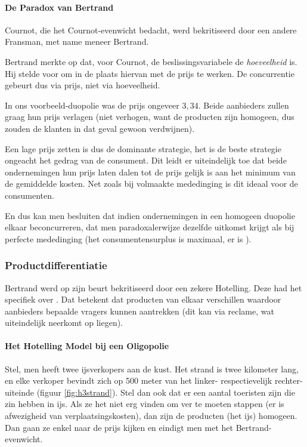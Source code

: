 \paragraph{De Paradox van Bertrand}

Cournot, die het Cournot-evenwicht bedacht, werd bekritiseerd door een andere Fransman, met name meneer Bertrand.
\par Bertrand merkte op dat, voor Cournot, de beslissingsvariabele de \textit{hoeveelheid} is. Hij stelde voor om in de plaats hiervan met de prijs te werken. De concurrentie gebeurt dus via prijs, niet via hoeveelheid.\\

\par In ons voorbeeld-duopolie was de prijs ongeveer $3,34$. Beide aanbieders zullen graag hun prijs verlagen (niet verhogen, want de producten zijn homogeen, dus zouden de klanten in dat geval gewoon verdwijnen). 
\par Een lage prijs zetten is dus de dominante strategie, het is de beste strategie ongeacht het gedrag van de consument. Dit leidt er uiteindelijk toe dat beide ondernemingen hun prijs laten dalen tot de prijs gelijk is aan het minimum van de gemiddelde kosten. Net zoals bij volmaakte mededinging is dit ideaal voor de consumenten.
\par En dus kan men besluiten dat indien ondernemingen in een homogeen duopolie elkaar beconcurreren, dat men paradoxalerwijze dezelfde uitkomst krijgt als bij perfecte mededinging (het consumentensurplus is maximaal, er is ).

\subsubsection{Productdifferentiatie}

Bertrand werd op zijn beurt bekritiseerd door een zekere Hotelling. Deze had het specifiek over . Dat betekent dat producten van elkaar verschillen waardoor aanbieders bepaalde vragers kunnen aantrekken (dit kan via reclame, wat uiteindelijk neerkomt op liegen).

\paragraph{Het Hotelling Model bij een Oligopolie}

Stel, men heeft twee ijsverkopers aan de kust. Het strand is twee kilometer lang, en elke verkoper bevindt zich op 500 meter van het linker- respectievelijk rechter-uiteinde (figuur \ref{fig:h3strand}). Stel dan ook dat er een aantal toeristen zijn die zin hebben in ijs. Als ze het niet erg vinden om ver te moeten stappen (er is afwezigheid van verplaatsingskosten), dan zijn de producten (het ijs) homogeen. Dan gaan ze enkel naar de prijs kijken en eindigt men met het Bertrand-evenwicht. \\

